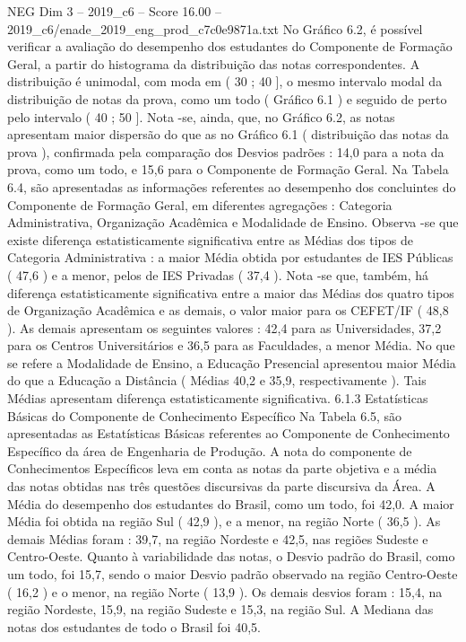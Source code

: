 \begin{textsample}{NEG Dim 3 – 2019\_c6 – Score 16.00 – 2019\_c6/enade\_2019\_eng\_prod\_c7c0e9871a.txt}
No Gráfico 6.2, é possível verificar a avaliação do desempenho dos estudantes do Componente de Formação Geral, a partir do histograma da distribuição das notas correspondentes.
A distribuição é unimodal, com moda em ( 30 ; 40 ], o mesmo intervalo modal da distribuição de notas da prova, como um todo ( Gráfico 6.1 ) e seguido de perto pelo intervalo ( 40 ; 50 ].
Nota -se, ainda, que, no Gráfico 6.2, as notas apresentam maior dispersão do que as no Gráfico 6.1 ( distribuição das notas da prova ), confirmada pela comparação dos Desvios padrões : 14,0 para a nota da prova, como um todo, e 15,6 para o Componente de Formação Geral.
Na Tabela 6.4, são apresentadas as informações referentes ao desempenho dos concluintes do Componente de Formação Geral, em diferentes agregações : Categoria Administrativa, Organização Acadêmica e Modalidade de Ensino.
Observa -se que existe diferença estatisticamente significativa entre as Médias dos tipos de Categoria Administrativa : a maior Média obtida por estudantes de IES Públicas ( 47,6 ) e a menor, pelos de IES Privadas ( 37,4 ).
Nota -se que, também, há diferença estatisticamente significativa entre a maior das Médias dos quatro tipos de Organização Acadêmica e as demais, o valor maior para os CEFET/IF ( 48,8 ).
As demais apresentam os seguintes valores : 42,4 para as Universidades, 37,2 para os Centros Universitários e 36,5 para as Faculdades, a menor Média.
No que se refere a Modalidade de Ensino, a Educação Presencial apresentou maior Média do que a Educação a Distância ( Médias 40,2 e 35,9, respectivamente ).
Tais Médias apresentam diferença estatisticamente significativa. 6.1.3 Estatísticas Básicas do Componente de Conhecimento Específico Na Tabela 6.5, são apresentadas as Estatísticas Básicas referentes ao Componente de Conhecimento Específico da área de Engenharia de Produção.
A nota do componente de Conhecimentos Específicos leva em conta as notas da parte objetiva e a média das notas obtidas nas três questões discursivas da parte discursiva da Área.
A Média do desempenho dos estudantes do Brasil, como um todo, foi 42,0.
A maior Média foi obtida na região Sul ( 42,9 ), e a menor, na região Norte ( 36,5 ).
As demais Médias foram : 39,7, na região Nordeste e 42,5, nas regiões Sudeste e Centro-Oeste.
Quanto à variabilidade das notas, o Desvio padrão do Brasil, como um todo, foi 15,7, sendo o maior Desvio padrão observado na região Centro-Oeste ( 16,2 ) e o menor, na região Norte ( 13,9 ).
Os demais desvios foram : 15,4, na região Nordeste, 15,9, na região Sudeste e 15,3, na região Sul.
A Mediana das notas dos estudantes de todo o Brasil foi 40,5.

\end{textsample}
